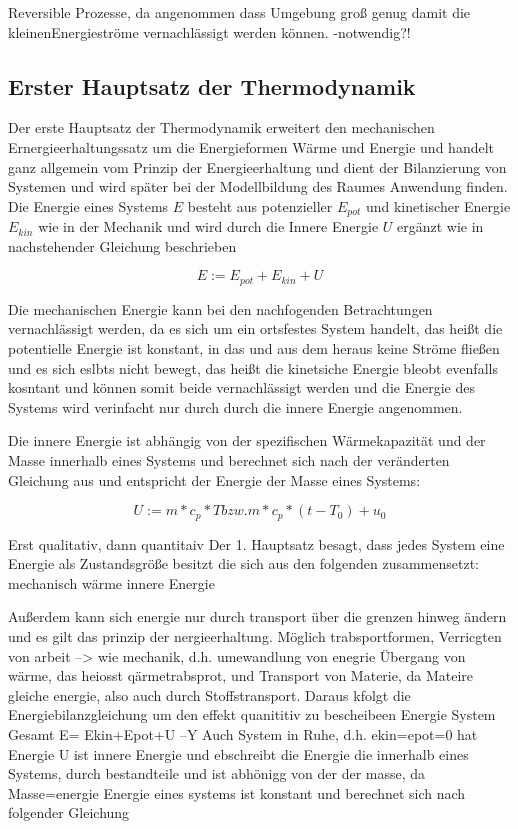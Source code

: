 Reversible Prozesse, da angenommen dass Umgebung groß genug damit die \Gun kleinen\Gob Energieströme vernachlässigt werden können. -notwendig?!


\subsection{Erster Hauptsatz der Thermodynamik}

\cite[S.~43ff.]{ba12}
Der erste Hauptsatz der Thermodynamik erweitert den mechanischen Ernergieerhaltungssatz um die Energieformen Wärme und Energie und handelt ganz allgemein vom Prinzip der Energieerhaltung und dient der Bilanzierung von Systemen und wird später bei der Modellbildung des Raumes Anwendung finden. 
Die Energie eines Systems $E$ besteht aus potenzieller $E_{pot}$ und kinetischer Energie $E_{kin}$ wie in der Mechanik und wird durch die Innere Energie $U$ ergänzt wie in nachstehender Gleichung beschrieben \cite[S.~49]{ba12}

\begin{equation}
\label{eq:energie}
E := E_{pot} + E_{kin} + U
\end{equation}
 
Die mechanischen Energie kann bei den nachfogenden Betrachtungen vernachlässigt werden, da es sich um ein ortsfestes System handelt, das heißt die potentielle Energie ist konstant, in das und aus dem heraus keine Ströme fließen und es sich eslbts nicht bewegt, das heißt die kinetsiche Energie bleobt evenfalls kosntant und können somit beide vernachlässigt werden und die Energie des Systems wird verinfacht nur durch durch die innere Energie angenommen.



Die innere Energie ist abhängig von der spezifischen Wärmekapazität und der Masse innerhalb eines Systems und berechnet sich nach der veränderten Gleichung aus \cite[S.~54]{ba12} und entspricht der Energie der Masse eines Systems:

\begin{equation}
\label{eq:innereenergie}
U := m*c_p*T bzw. m*c_p*(t-T_0)+u_0
\end{equation}

Erst qualitativ, dann quantitaiv
Der 1. Hauptsatz besagt, dass jedes System eine Energie als Zustandsgröße besitzt die sich aus den folgenden zusammensetzt:
mechanisch
wärme
innere Energie

\cite[S.~48]{ba12}
Außerdem kann sich energie nur durch transport über die grenzen hinweg ändern und es gilt das prinzip der nergieerhaltung. Möglich trabsportformen, Verricgten von arbeit --> wie mechanik, d.h. umewandlung von enegrie
Übergang von wärme, das heiosst qärmetrabsprot, und Transport von Materie, da Mateire gleiche energie, also auch durch Stoffstransport.
Daraus kfolgt die Energiebilanzgleichung um den effekt quanititiv zu bescheibeen
Energie System Gesamt E= Ekin+Epot+U --Y Auch System in Ruhe, d.h. ekin=epot=0 hat Energie
U ist innere Energie und ebschreibt die Energie die innerhalb eines Systems, durch bestandteile und ist abhönigg von der der masse, da Masse=energie
Energie eines systems ist konstant und berechnet sich nach folgender Gleichung \cite[S.~54]{ba12}

